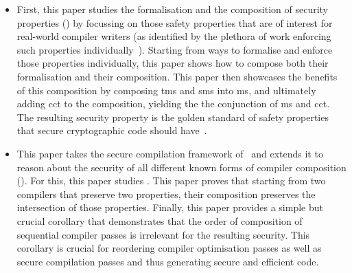 \documentclass[acmsmall,review,screen,dvipsnames]{acmart}
\begin{document}
\begin{itemize}
  \item %
        First, this paper studies the formalisation and the composition of security properties () by focussing on those safety properties that are of interest for real-world compiler writers (as identified by the plethora of work enforcing such properties individually~).
        Starting from ways to formalise and enforce those properties individually, this paper shows how to compose both their formalisation and their composition.
        This paper then showcases the benefits of this composition by composing \gls{tms} and \gls{sms} into \gls{ms}, and ultimately adding \gls{cct} to the composition, yielding the the conjunction of \gls{ms} and \gls{cct}.
        The resulting security property is the golden standard of safety properties that secure cryptographic code should have~.

  \item %
        This paper takes the secure compilation framework of~\citep{abate2019jour} and extends it to reason about the security of all different known forms of compiler composition ().
        For this, this paper studies \MP{}.
        This paper proves that starting from two compilers that preserve two properties, their composition preserves the intersection of those properties.
        Finally, this paper provides a simple but crucial corollary that demonstrates that the order of composition of sequential compiler passes is irrelevant for the resulting security.
        This corollary is crucial for reordering compiler optimisation passes as well as secure compilation passes and thus generating secure and efficient code.


\end{itemize}
\end{document}
